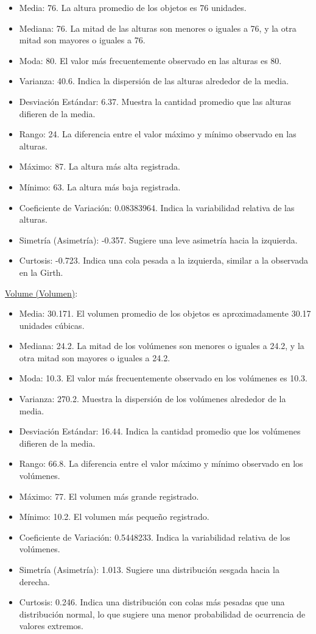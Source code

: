 \documentclass{article}
\begin{document}
\begin{itemize}
    \item Media: 76. La altura promedio de los objetos es 76 unidades.
    \item Mediana: 76. La mitad de las alturas son menores o iguales a 76, y la otra mitad son mayores o iguales a 76.
    \item Moda: 80. El valor más frecuentemente observado en las alturas es 80.
    \item Varianza: 40.6. Indica la dispersión de las alturas alrededor de la media.
    \item Desviación Estándar: 6.37. Muestra la cantidad promedio que las alturas difieren de la media.
    \item Rango: 24. La diferencia entre el valor máximo y mínimo observado en las alturas.
    \item Máximo: 87. La altura más alta registrada.
    \item Mínimo: 63. La altura más baja registrada.
    \item Coeficiente de Variación: 0.08383964. Indica la variabilidad relativa de las alturas.
    \item Simetría (Asimetría): -0.357. Sugiere una leve asimetría hacia la izquierda.
    \item Curtosis: -0.723. Indica una cola pesada a la izquierda, similar a la observada en la Girth.
\end{itemize}
\underline{Volume (Volumen)}:
\begin{itemize}
    \item Media: 30.171. El volumen promedio de los objetos es aproximadamente 30.17 unidades cúbicas.
    \item Mediana: 24.2. La mitad de los volúmenes son menores o iguales a 24.2, y la otra mitad son mayores o iguales a 24.2.
    \item Moda: 10.3. El valor más frecuentemente observado en los volúmenes es 10.3.
    \item Varianza: 270.2. Muestra la dispersión de los volúmenes alrededor de la media.
    \item Desviación Estándar: 16.44. Indica la cantidad promedio que los volúmenes difieren de la media.
    \item Rango: 66.8. La diferencia entre el valor máximo y mínimo observado en los volúmenes.
    \item Máximo: 77. El volumen más grande registrado.
    \item Mínimo: 10.2. El volumen más pequeño registrado.
    \item Coeficiente de Variación: 0.5448233. Indica la variabilidad relativa de los volúmenes.
    \item Simetría (Asimetría): 1.013. Sugiere una distribución sesgada hacia la derecha.
    \item Curtosis: 0.246. Indica una distribución con colas más pesadas que una distribución normal, lo que sugiere una menor probabilidad de ocurrencia de valores extremos.
\end{itemize}
\end{document}

